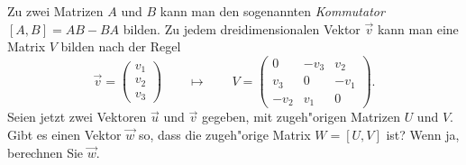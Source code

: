 Zu zwei Matrizen $A$ und $B$ kann man den sogenannten {\em Kommutator}
$[A,B]=AB-BA$ bilden.
Zu jedem dreidimensionalen Vektor $\vec v$ kann man eine Matrix $V$
bilden nach der Regel
\[
\vec v
=
\begin{pmatrix}v_1\\v_2\\v_3\end{pmatrix}
\qquad
\mapsto
\qquad
V
=
\begin{pmatrix}
   0&-v_3& v_2\\
 v_3&   0&-v_1\\
-v_2& v_1&   0
\end{pmatrix}.
\]
Seien jetzt zwei Vektoren $\vec u$ und $\vec v$ gegeben, mit zugeh"origen
Matrizen $U$ und $V$.
Gibt es einen Vektor $\vec w$ so, dass die zugeh"orige Matrix $W=[U,V]$ ist?
Wenn ja, berechnen Sie $\vec w$.

